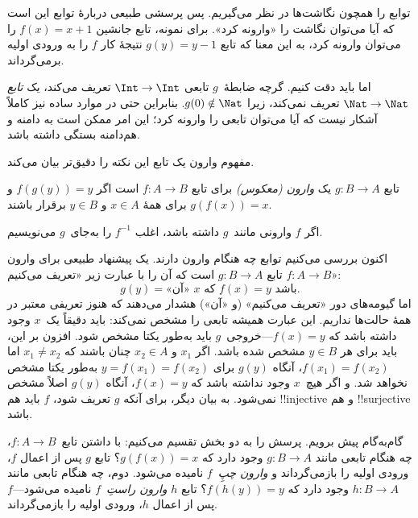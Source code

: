 \documentclass[../../../include/open-logic-section]{subfiles}
\begin{document}

\begin{explain}
توابع را همچون نگاشت‌ها در نظر می‌گیریم. پس پرسشی طبیعی دربارهٔ
توابع این است که آیا می‌توان نگاشت را «وارونه کرد». برای
نمونه، تابع جانشین $f(x) = x + 1$ را می‌توان وارونه کرد، به
این معنا که تابع $g(y) = y - 1$ نتیجهٔ کار $f$ را به ورودی اولیه برمی‌گرداند.

اما باید دقت کنیم. گرچه ضابطهٔ~$g$ تابعی
$\Int \to \Int$ تعریف می‌کند، یک \emph{تابع} $\Nat
\to \Nat$ تعریف نمی‌کند، زیرا $g(0) \notin \Nat$. بنابراین حتی در موارد ساده نیز
کاملاً آشکار نیست که آیا می‌توان تابعی را وارونه کرد؛ این امر ممکن است به
دامنه و هم‌دامنه بستگی داشته باشد.

مفهوم وارون یک تابع این نکته را دقیق‌تر بیان می‌کند.
\end{explain}

\begin{defn}
تابع $g \colon B \to A$ یک \emph{وارون (معکوس)} برای تابع $f
\colon A \to B$ است اگر $f(g(y)) = y$ و $g(f(x)) = x$ برای همهٔ $x \in A$
و $y \in B$ برقرار باشند.
\end{defn}

اگر $f$ وارونی مانند~$g$ داشته باشد، اغلب $f^{-1}$ را به‌جای~$g$ می‌نویسیم.

\begin{explain}
اکنون بررسی می‌کنیم توابع چه هنگام وارون دارند. یک پیشنهاد طبیعی
برای وارون $f\colon A \to B$ تابع $g\colon B \to A$ است که آن را با عبارت زیر
«تعریف می‌کنیم»:
\[
g(y) = \text{«آن» $x$ که $f(x) = y$ باشد.}
\]
اما گیومه‌های دور «تعریف می‌کنیم» (و «آن») هشدار می‌دهند که
هنوز تعریفی معتبر در همهٔ حالت‌ها نداریم. این عبارت همیشه
تابعی را مشخص نمی‌کند: باید دقیقاً یک~$x$
وجود داشته باشد که $f(x) =
y$---خروجی~$g$ باید به‌طور یکتا مشخص شود. افزون بر این، باید
برای هر $y \in B$ مشخص شده باشد. اگر $x_1$ و $x_2 \in
A$ چنان باشند که $x_1 \neq x_2$ اما $f(x_1) = f(x_2)$، آنگاه $g(y)$ برای
$y = f(x_1) = f(x_2)$ به‌طور یکتا مشخص نخواهد شد. و اگر هیچ~$x$
وجود نداشته باشد که $f(x) = y$، آنگاه $g(y)$ اصلاً مشخص نمی‌شود. به
بیان دیگر، برای آنکه $g$ تعریف شود، $f$ باید هم !!{injective} و هم
!!{surjective} باشد.

گام‌به‌گام پیش برویم. پرسش را به دو بخش تقسیم می‌کنیم: با داشتن
تابع~$f\colon A \to B$، چه هنگام تابعی مانند $g\colon B \to A$
وجود دارد که $g(f(x)) = x$؟ تابع $g$ پس از اعمال $f$، ورودی اولیه را بازمی‌گرداند و
\emph{وارون چپِ}~$f$ نامیده می‌شود. دوم، چه هنگام
تابعی مانند $h\colon B \to A$ وجود دارد که $f(h(y)) = y$؟ تابع $h$
\emph{وارون راستِ}~$f$ نامیده می‌شود---$f$ پس از اعمال $h$، ورودی اولیه را بازمی‌گرداند.
\end{explain}
\end{document}
